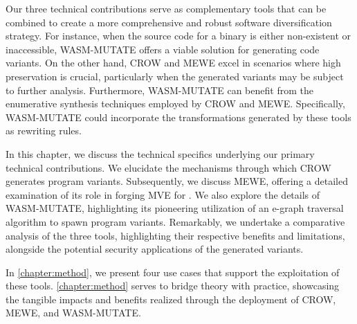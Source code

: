 \begin{tcolorbox}[title=Key Takeaway,boxrule=1pt,arc=.2em,boxsep=1.0mm]
    
    Our three technical contributions serve as complementary tools that can be combined to create a more comprehensive and robust software diversification strategy. 
    For instance, when the source code for a \Wasm binary is either non-existent or inaccessible, WASM-MUTATE offers a viable solution for generating code variants. 
    On the other hand, CROW and MEWE excel in scenarios where high preservation is crucial, particularly when the generated variants may be subject to further analysis. Furthermore, WASM-MUTATE can benefit from the enumerative synthesis techniques employed by CROW and MEWE. 
    Specifically, WASM-MUTATE could incorporate the transformations generated by these tools as rewriting rules.
\end{tcolorbox}



In this chapter, we discuss the technical specifics underlying our primary technical contributions.
We elucidate the mechanisms through which CROW generates program variants.
Subsequently, we discuss MEWE, offering a detailed examination of its role in forging MVE for \Wasm. 
We also explore the details of WASM-MUTATE, highlighting its pioneering utilization of an e-graph traversal algorithm to spawn \wasm program variants. 
Remarkably, we undertake a comparative analysis of the three tools, highlighting their respective benefits and limitations, alongside the potential security applications of the generated \wasm variants. 

In \autoref{chapter:method}, we present four use cases that support the exploitation of these tools.
\autoref{chapter:method} serves to bridge theory with practice, showcasing the tangible impacts and benefits realized through the deployment of CROW, MEWE, and WASM-MUTATE.
